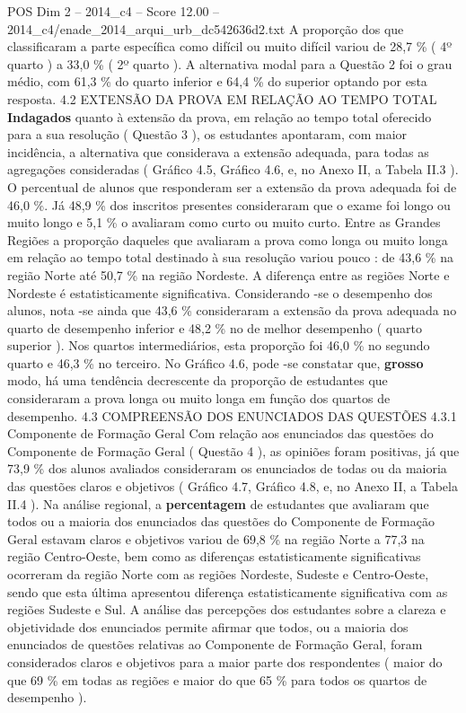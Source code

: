 \begin{textsample}{POS Dim 2 – 2014\_c4 – Score 12.00 – 2014\_c4/enade\_2014\_arqui\_urb\_dc542636d2.txt}
A proporção dos que classificaram a parte específica como difícil ou muito difícil variou de 28,7 \% ( 4º quarto ) a 33,0 \% ( 2º quarto ).
A alternativa modal para a Questão 2 foi o grau médio, com 61,3 \% do quarto inferior e 64,4 \% do superior optando por esta resposta. 4.2 EXTENSÃO DA PROVA EM RELAÇÃO AO TEMPO TOTAL \textbf{Indagados} quanto à extensão da prova, em relação ao tempo total oferecido para a sua resolução ( Questão 3 ), os estudantes apontaram, com maior incidência, a alternativa que considerava a extensão adequada, para todas as agregações consideradas ( Gráfico 4.5, Gráfico 4.6, e, no Anexo II, a Tabela II.3 ).
O percentual de alunos que responderam ser a extensão da prova adequada foi de 46,0 \%.
Já 48,9 \% dos inscritos presentes consideraram que o exame foi longo ou muito longo e 5,1 \% o avaliaram como curto ou muito curto.
Entre as Grandes Regiões a proporção daqueles que avaliaram a prova como longa ou muito longa em relação ao tempo total destinado à sua resolução variou pouco : de 43,6 \% na região Norte até 50,7 \% na região Nordeste.
A diferença entre as regiões Norte e Nordeste é estatisticamente significativa.
Considerando -se o desempenho dos alunos, nota -se ainda que 43,6 \% consideraram a extensão da prova adequada no quarto de desempenho inferior e 48,2 \% no de melhor desempenho ( quarto superior ).
Nos quartos intermediários, esta proporção foi 46,0 \% no segundo quarto e 46,3 \% no terceiro.
No Gráfico 4.6, pode -se constatar que, \textbf{grosso} modo, há uma tendência decrescente da proporção de estudantes que consideraram a prova longa ou muito longa em função dos quartos de desempenho. 4.3 COMPREENSÃO DOS ENUNCIADOS DAS QUESTÕES 4.3.1 Componente de Formação Geral Com relação aos enunciados das questões do Componente de Formação Geral ( Questão 4 ), as opiniões foram positivas, já que 73,9 \% dos alunos avaliados consideraram os enunciados de todas ou da maioria das questões claros e objetivos ( Gráfico 4.7, Gráfico 4.8, e, no Anexo II, a Tabela II.4 ).
Na análise regional, a \textbf{percentagem} de estudantes que avaliaram que todos ou a maioria dos enunciados das questões do Componente de Formação Geral estavam claros e objetivos variou de 69,8 \% na região Norte a 77,3 na região Centro-Oeste, bem como as diferenças estatisticamente significativas ocorreram da região Norte com as regiões Nordeste, Sudeste e Centro-Oeste, sendo que esta última apresentou diferença estatisticamente significativa com as regiões Sudeste e Sul.
A análise das percepções dos estudantes sobre a clareza e objetividade dos enunciados permite afirmar que todos, ou a maioria dos enunciados de questões relativas ao Componente de Formação Geral, foram considerados claros e objetivos para a maior parte dos respondentes ( maior do que 69 \% em todas as regiões e maior do que 65 \% para todos os quartos de desempenho ).

\end{textsample}
